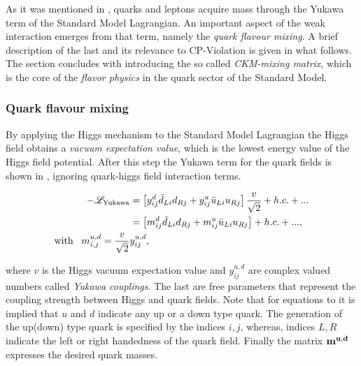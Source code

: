 As it was mentioned in , quarks and leptons acquire mass through the Yukawa term
of the Standard Model Lagrangian. An important aspect of the weak interaction emerges from that term,
namely the {\it quark flavour mixing}. A brief description of the last and its relevance to CP-Violation is given in what follows.
The section concludes with introducing the so called {\it CKM-mixing matrix}, which is the core of the
{\it flavor physics} in the quark sector of the Standard Model.

\subsubsection{Quark flavour mixing}
By applying the Higgs mechanism\cite{PhysRevLett.13.321,PhysRevLett.13.508} to the Standard Model Lagrangian the Higgs field obtains a
{\it vacuum expectation value}, which is the lowest energy value of the Higgs field potential.
After this step the Yukawa term for the quark fields is shown in ,
 ignoring quark-higgs field interaction terms.

\begin{subequations}
\label{yukawa_flavour}
\centering
  \begin{align}
  -\mathscr{L}_{\text{Yukawa}} &= \left[ y_{ij}^d \bar{d}_{Li} d_{Rj} + y_{ij}^u \bar{u}_{Li} u_{Rj} \right] \frac{v}{\sqrt{2}} + h.c. + ...  \\
                               &= \left[ m_{ij}^d \bar{d}_{Li} d_{Rj} + m_{ij}^u \bar{u}_{Li} u_{Rj} \right] + h.c. + ...,  \\
                               \text{with} \;\;\; m^{u,d}_{i,j} = \frac{v}{\sqrt{2}} & y_{ij}^{u,d}, \nonumber
  \end{align}
\end{subequations}

\noindent where $v$ is the Higgs vacuum expectation value and $y_{ij}^{u,d}$ are complex valued numbers called {\it Yukawa couplings}.
The last are free parameters that represent the coupling strength between Higgs and quark fields.
Note that for equations  to  it is implied that $u$ and $d$ indicate
any up or a down type quark. The generation of the up(down) type quark is specified by the indices $i,j$,
whereas, indices $L,R$ indicate the left or right handedness of the quark field.
Finally the matrix $\bf m^{u,d}$ expresses the desired quark masses.

